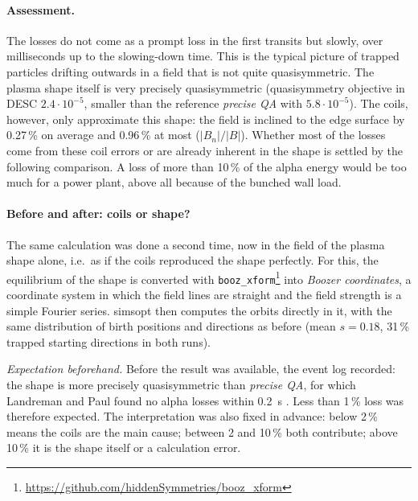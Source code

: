 \paragraph{Assessment.} The losses do not come as a prompt loss in the first transits but slowly, over milliseconds up
to the slowing-down time. This is the typical picture of trapped particles drifting outwards in a field that is not
quite quasisymmetric. The plasma shape itself is very precisely quasisymmetric (quasisymmetry objective in DESC
$2.4\cdot10^{-5}$, smaller than the reference \emph{precise QA} with $5.8\cdot10^{-5}$). The coils, however, only
approximate this shape: the field is inclined to the edge surface by 0.27\,\% on average and 0.96\,\% at most
($|B_n|/|B|$). Whether most of the losses come from these coil errors or are already inherent in the shape is
settled by the following comparison. A loss of more than 10\,\% of the alpha energy would be too much for a power
plant, above all because of the bunched wall load.

\paragraph{Before and after: coils or shape?} The same calculation was done a second time, now in the field of the
plasma shape alone, i.e.\ as if the coils reproduced the shape perfectly. For this, the equilibrium of the shape is
converted with \texttt{booz\_xform}\footnote{\url{https://github.com/hiddenSymmetries/booz_xform}} into
\emph{Boozer coordinates}, a coordinate system in which the field lines are straight and the field strength is a
simple Fourier series. simsopt then computes the orbits directly in it, with the same distribution of birth positions
and directions as before (mean $s = 0.18$, 31\,\% trapped starting directions in both runs).

\emph{Expectation beforehand.} Before the result was available, the event log recorded: the shape is more precisely
quasisymmetric than \emph{precise QA}, for which Landreman and Paul found no alpha losses within \SI{0.2}{s}
\cite{landreman2022}. Less than 1\,\% loss was therefore expected. The interpretation was also fixed in advance:
below 2\,\% means the coils are the main cause; between 2 and 10\,\% both contribute; above 10\,\% it is the shape
itself or a calculation error.


